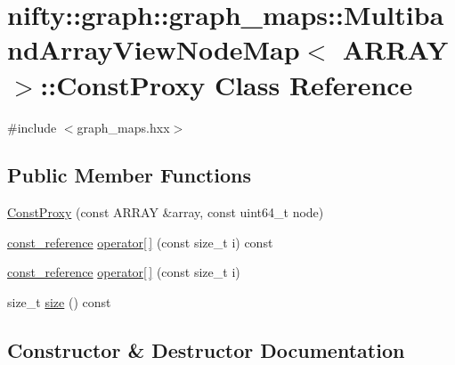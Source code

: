 \hypertarget{classnifty_1_1graph_1_1graph__maps_1_1MultibandArrayViewNodeMap_1_1ConstProxy}{}\section{nifty\+:\+:graph\+:\+:graph\+\_\+maps\+:\+:Multiband\+Array\+View\+Node\+Map$<$ A\+R\+R\+A\+Y $>$\+:\+:Const\+Proxy Class Reference}
\label{classnifty_1_1graph_1_1graph__maps_1_1MultibandArrayViewNodeMap_1_1ConstProxy}


{\ttfamily \#include $<$graph\+\_\+maps.\+hxx$>$}

\subsection*{Public Member Functions}
\begin{DoxyCompactItemize}
\item 
\hyperlink{classnifty_1_1graph_1_1graph__maps_1_1MultibandArrayViewNodeMap_1_1ConstProxy_ace907294b73877c79b223ce1bd4b89a9}{Const\+Proxy} (const A\+R\+R\+A\+Y \&array, const uint64\+\_\+t node)
\item 
\hyperlink{structnifty_1_1graph_1_1graph__maps_1_1MultibandArrayViewNodeMap_a9a4da5d4bb0e9439af359184b91bc65b}{const\+\_\+reference} \hyperlink{classnifty_1_1graph_1_1graph__maps_1_1MultibandArrayViewNodeMap_1_1ConstProxy_a2be8b9fb282e3f63d2c0e8e1078b0eaf}{operator\mbox{[}$\,$\mbox{]}} (const size\+\_\+t i) const 
\item 
\hyperlink{structnifty_1_1graph_1_1graph__maps_1_1MultibandArrayViewNodeMap_a9a4da5d4bb0e9439af359184b91bc65b}{const\+\_\+reference} \hyperlink{classnifty_1_1graph_1_1graph__maps_1_1MultibandArrayViewNodeMap_1_1ConstProxy_aaca8a39e292ca5e0e98fe8a49dc3d0fc}{operator\mbox{[}$\,$\mbox{]}} (const size\+\_\+t i)
\item 
size\+\_\+t \hyperlink{classnifty_1_1graph_1_1graph__maps_1_1MultibandArrayViewNodeMap_1_1ConstProxy_a032695ee7b839768dcba20859115cdd5}{size} () const 
\end{DoxyCompactItemize}


\subsection{Constructor \& Destructor Documentation}
\hypertarget{classnifty_1_1graph_1_1graph__maps_1_1MultibandArrayViewNodeMap_1_1ConstProxy_ace907294b73877c79b223ce1bd4b89a9}{}
